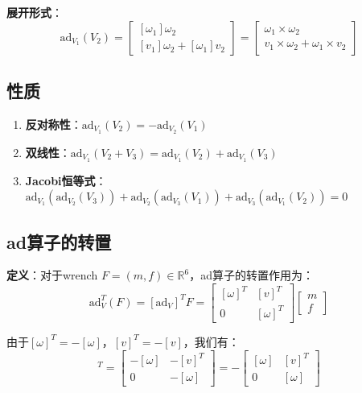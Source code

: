 \documentclass[12pt,a4paper]{article}
\begin{document}
\textbf{展开形式}：
\begin{equation}
\text{ad}_{V_1}(V_2) = \begin{bmatrix} [\omega_1] \omega_2 \\ [v_1] \omega_2 + [\omega_1] v_2 \end{bmatrix} = \begin{bmatrix} \omega_1 \times \omega_2 \\ v_1 \times \omega_2 + \omega_1 \times v_2 \end{bmatrix}
\end{equation}

\subsection{性质}

\begin{enumerate}
\item \textbf{反对称性}：$\text{ad}_{V_1}(V_2) = -\text{ad}_{V_2}(V_1)$
\item \textbf{双线性}：$\text{ad}_{V_1}(V_2 + V_3) = \text{ad}_{V_1}(V_2) + \text{ad}_{V_1}(V_3)$
\item \textbf{Jacobi恒等式}：$\text{ad}_{V_1}(\text{ad}_{V_2}(V_3)) + \text{ad}_{V_2}(\text{ad}_{V_3}(V_1)) + \text{ad}_{V_3}(\text{ad}_{V_1}(V_2)) = 0$
\end{enumerate}

\subsection{ad算子的转置}

\textbf{定义}：对于wrench $F = (m, f) \in \mathbb{R}^6$，ad算子的转置作用为：
\begin{equation}
\text{ad}_V^T(F) = [\text{ad}_V]^T F = \begin{bmatrix} [\omega]^T & [v]^T \\ 0 & [\omega]^T \end{bmatrix} \begin{bmatrix} m \\ f \end{bmatrix}
\end{equation}

由于$[\omega]^T = -[\omega]$，$[v]^T = -[v]$，我们有：
\begin{equation}
[\text{ad}_V]^T = \begin{bmatrix} -[\omega] & -[v]^T \\ 0 & -[\omega] \end{bmatrix} = -\begin{bmatrix} [\omega] & [v]^T \\ 0 & [\omega] \end{bmatrix}
\end{equation}
\end{document}
